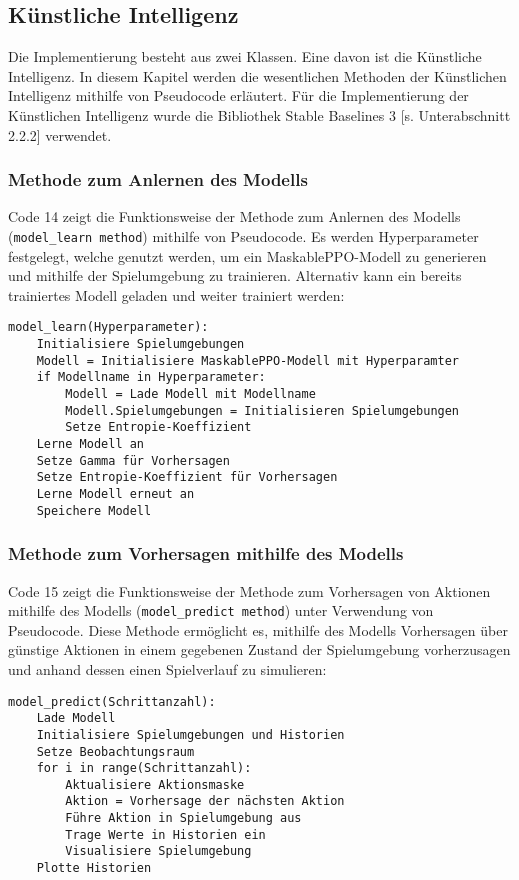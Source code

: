 \subsection{Künstliche Intelligenz}
Die Implementierung besteht aus zwei Klassen. Eine davon ist die Künstliche Intelligenz. In diesem Kapitel werden die wesentlichen Methoden der Künstlichen Intelligenz mithilfe von Pseudocode erläutert. Für die Implementierung der Künstlichen Intelligenz wurde die Bibliothek Stable Baselines 3 [s. Unterabschnitt 2.2.2] verwendet.
\subsubsection{Methode zum Anlernen des Modells}
\begin{minipage}{\linewidth}
Code 14 zeigt die Funktionsweise der Methode zum Anlernen des Modells (\texttt{model\_learn method}) mithilfe von Pseudocode. Es werden Hyperparameter festgelegt, welche genutzt werden, um ein MaskablePPO-Modell zu generieren und mithilfe der Spielumgebung zu trainieren. Alternativ kann ein bereits trainiertes Modell geladen und weiter trainiert werden:
\vspace{0.5cm}
\begin{lstlisting}[caption={Methode zu Anlernen des Modells}]
model_learn(Hyperparameter):
	Initialisiere Spielumgebungen
	Modell = Initialisiere MaskablePPO-Modell mit Hyperparamter
	if Modellname in Hyperparameter:
		Modell = Lade Modell mit Modellname
		Modell.Spielumgebungen = Initialisieren Spielumgebungen
		Setze Entropie-Koeffizient
	Lerne Modell an
	Setze Gamma für Vorhersagen
	Setze Entropie-Koeffizient für Vorhersagen
	Lerne Modell erneut an
	Speichere Modell
\end{lstlisting}
\end{minipage}
\subsubsection{Methode zum Vorhersagen mithilfe des Modells}
\begin{minipage}{\linewidth}
Code 15 zeigt die Funktionsweise der Methode zum Vorhersagen von Aktionen mithilfe des Modells (\texttt{model\_predict method}) unter Verwendung von Pseudocode. Diese Methode ermöglicht es, mithilfe des Modells Vorhersagen über günstige Aktionen in einem gegebenen Zustand der Spielumgebung vorherzusagen und anhand dessen einen Spielverlauf zu simulieren:
\vspace{0.5cm}
\begin{lstlisting}[caption={Methode zum Vorhersagen von Aktionen mithilfe des Modells}]
model_predict(Schrittanzahl):
	Lade Modell
	Initialisiere Spielumgebungen und Historien
	Setze Beobachtungsraum
	for i in range(Schrittanzahl):
		Aktualisiere Aktionsmaske
		Aktion = Vorhersage der nächsten Aktion
		Führe Aktion in Spielumgebung aus
		Trage Werte in Historien ein
		Visualisiere Spielumgebung
	Plotte Historien
\end{lstlisting}
\end{minipage}
